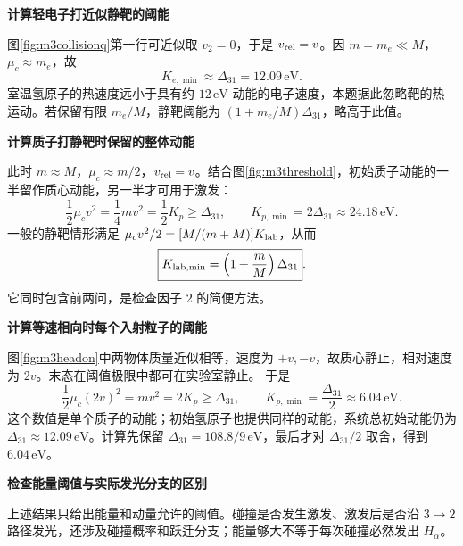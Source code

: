 \begin{solution}
 

\par\medskip{}\noindent\textbf{计算轻电子打近似静靶的阈能}\par\nobreak
图\ref{fig:m3collisionq}第一行可近似取 \(v_2=0\)，于是 \(v_{\rm rel}=v\)。因 \(m=m_e\ll M\)，\(\mu_c\approx m_e\)，故
\[
 \boxed{K_{e,\min}\approx\Delta_{31}=12.09\,\mathrm{eV}}.
\]
室温氢原子的热速度远小于具有约 \(12\,\mathrm{eV}\) 动能的电子速度，本题据此忽略靶的热运动。若保留有限 \(m_e/M\)，静靶阈能为 \((1+m_e/M)\Delta_{31}\)，略高于此值。

 

\par\medskip{}\noindent\textbf{计算质子打静靶时保留的整体动能}\par\nobreak
此时 \(m\approx M\)，\(\mu_c\approx m/2\)，\(v_{\rm rel}=v\)。结合图\ref{fig:m3threshold}，初始质子动能的一半留作质心动能，另一半才可用于激发：
\[
 \frac12\mu_c v^2=\frac14mv^2=\frac12K_p\ge\Delta_{31},
 \qquad\boxed{K_{p,\min}=2\Delta_{31}\approx24.18\,\mathrm{eV}}.
\]
一般的静靶情形满足 \(\mu_c v^2/2=[M/(m+M)]K_{\rm lab}\)，从而
\[
 \boxed{K_{{\rm lab},\min}=\left(1+\frac mM\right)\Delta_{31}}.
\]
它同时包含前两问，是检查因子 \(2\) 的简便方法。

 

\par\medskip{}\noindent\textbf{计算等速相向时每个入射粒子的阈能}\par\nobreak
图\ref{fig:m3headon}中两物体质量近似相等，速度为 \(+v,-v\)，故质心静止，相对速度为 \(2v\)。末态在阈值极限中都可在实验室静止。
于是
\[
 \frac12\mu_c(2v)^2=mv^2=2K_p\ge\Delta_{31},\qquad
 \boxed{K_{p,\min}=\frac{\Delta_{31}}2\approx6.04\,\mathrm{eV}}.
\]
这个数值是单个质子的动能；初始氢原子也提供同样的动能，系统总初始动能仍为 $\Delta_{31}\approx12.09\,\mathrm{eV}$。计算先保留 $\Delta_{31}=108.8/9\,\mathrm{eV}$，最后才对 $\Delta_{31}/2$ 取舍，得到 $6.04\,\mathrm{eV}$。



\par\medskip{}\noindent\textbf{检查能量阈值与实际发光分支的区别}\par\nobreak
上述结果只给出能量和动量允许的阈值。碰撞是否发生激发、激发后是否沿 \(3\to2\) 路径发光，还涉及碰撞概率和跃迁分支；能量够大不等于每次碰撞必然发出 \(H_\alpha\)。
\end{solution}
